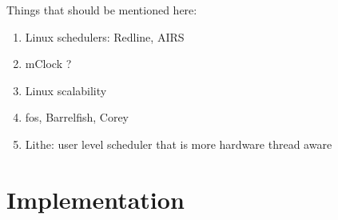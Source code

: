 \documentclass[letterpaper,twocolumn,11pt]{article}
\begin{document}
Things that should be mentioned here:
\begin{enumerate}
\item Linux schedulers: Redline, AIRS
\item mClock ?
\item Linux scalability
\item fos, Barrelfish, Corey
\item Lithe: user level scheduler that is more hardware thread aware
\end{enumerate}

\section{Implementation}

\begin{figure}[ht]
  \begin{center}

\end{center}
\end{figure}
\end{document}
